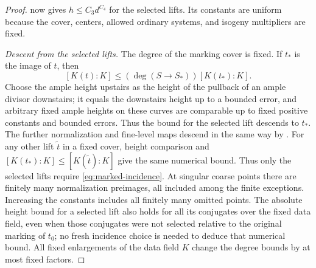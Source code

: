 \begin{proof}
 now gives $h\le C_3d^{C_4}$ for the selected
lifts.  Its constants are uniform because the cover, centers, allowed
ordinary systems, and isogeny multipliers are fixed.

\emph{Descent from the selected lifts.}
The degree of the marking cover is fixed.  If $t_*$ is the image of $t$,
then
\[
 [K(t):K]\le (\deg(S\to S_*))[K(t_*):K].
\]
Choose the ample height upstairs as the height of the pullback of an
ample divisor downstairs; it equals the downstairs height up to a
bounded error, and arbitrary fixed ample heights on these curves are
comparable up to fixed positive constants and bounded errors.  Thus the
bound for the selected lift descends to $t_*$.  The further normalization
and fine-level maps descend in the same way by .
For any other lift $\widetilde t$ in a fixed cover, height comparison
and $[K(t_*):K]\le[K(\widetilde t):K]$ give the same numerical bound.
Thus only the selected lifts require \eqref{eq:marked-incidence}.
At singular coarse points there are finitely many normalization
preimages, all included among the finite exceptions.  Increasing the
constants includes all finitely many omitted points.
The absolute height bound for a selected lift also holds for all its
conjugates over the fixed data field, even when those conjugates were not
selected relative to the original marking of $t_0$; no fresh incidence
choice is needed to deduce that numerical bound.  All fixed enlargements
of the data field $K$ change the degree bounds by at most fixed factors.
\end{proof}
